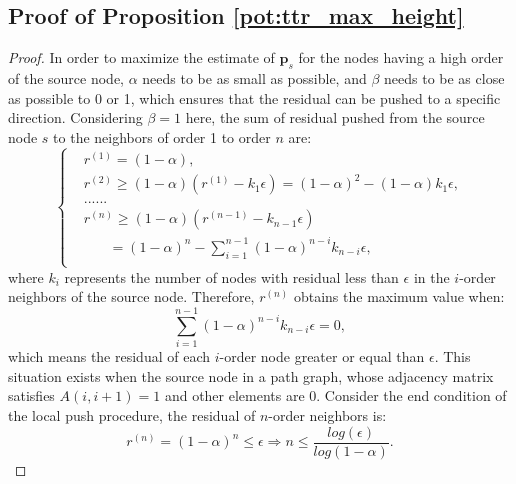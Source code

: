 \subsection{Proof of Proposition \ref{pot:ttr_max_height}}
\begin{proof}
In order to maximize the estimate of $\bm{p}_s$ for the nodes having a high order of the source node, $\alpha$ needs to be as small as possible, and $\beta$ needs to be as close as possible to 0 or 1, which ensures that the residual can be pushed to a specific direction.
Considering $\beta=1$ here, the sum of residual pushed from the source node $s$ to the neighbors of order 1 to order $n$ are:
\begin{equation}
    \begin{cases}
        & r^{(1)}=(1-\alpha), \\
        & r^{(2)} \geq (1-\alpha)(r^{(1)}-k_1 \epsilon)=(1-\alpha)^2-(1-\alpha)k_1 \epsilon, \\
        & ...... \\
        & r^{(n)} \geq (1-\alpha)(r^{(n-1)}-k_{n-1} \epsilon) \\
        & \ \ \ \ \ \ \ \ =(1-\alpha)^n-\sum\limits_{i=1}^{n-1}(1-\alpha)^{n-i}k_{n-i} \epsilon, \\
    \end{cases}
\end{equation}
where $k_i$ represents the number of nodes with residual less than $\epsilon$ in the $i$-order neighbors of the source node.
Therefore, $r^{(n)}$ obtains the maximum value when:
\begin{equation}
    \sum\limits_{i=1}^{n-1}(1-\alpha)^{n-i}k_{n-i} \epsilon = 0,
\end{equation}
which means the residual of each $i$-order node greater or equal than $\epsilon$. 
This situation exists when the source node in a path graph, whose adjacency matrix satisfies $A(i,i+1)=1$ and other elements are $0$.
Consider the end condition of the local push procedure, the residual of $n$-order neighbors is:
\begin{equation}
    r^{(n)}=(1-\alpha)^n \leq \epsilon \Rightarrow n \leq \frac{log(\epsilon)}{log(1-\alpha)}.
\end{equation}
\end{proof}

